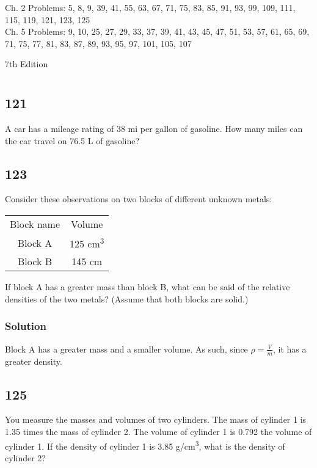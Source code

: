 \documentclass[11pt]{report}
\begin{document}
Ch. 2 Problems: 5, 8, 9, 39, 41, 55, 63, 67, 71, 75, 83, 85, 91, 93, 99, 109, 111, 115, 119, 121, 123, 125\\
Ch. 5 Problems: 9, 10, 25, 27, 29, 33, 37, 39, 41, 43, 45, 47, 51, 53, 57, 61, 65, 69, 71, 75, 77, 81, 83, 87, 89, 93, 95, 97, 101, 105, 107

7th Edition
\setcounter{chapter}{1}
\pagebreak
\chapter{}

\section{121}
A car has a mileage rating of 38 mi per gallon of gasoline. How many miles can the car travel on 76.5 L of gasoline?

\section{123}
Consider these observations on two blocks of different unknown metals:

\begin{center}
    \begin{tabular*}{0.25\textwidth}{c c}
        Block name  & Volume \\
        Block A     & 125 \unit{\centi\meter^3}\\
        Block B     & 145 \unit{\centi\meter}
    \end{tabular*}
\end{center}          
        
If block A has a greater mass than block B, what can be said of the relative densities of the two metals? (Assume that both blocks are solid.)

\subsection{Solution}
Block A has a greater mass and a smaller volume. As such, since $\rho = \frac{V}{m}$, it has a greater density.

\section{125}
You measure the masses and volumes of two cylinders. The mass of cylinder 1 is 1.35 times the mass of cylinder 2. The volume of cylinder 1 is 0.792 the volume of cylinder 1. If the density of cylinder 1 is 3.85 \unit{\gram/\centi\meter^3}, what is the density of cylinder 2?
\end{document}

